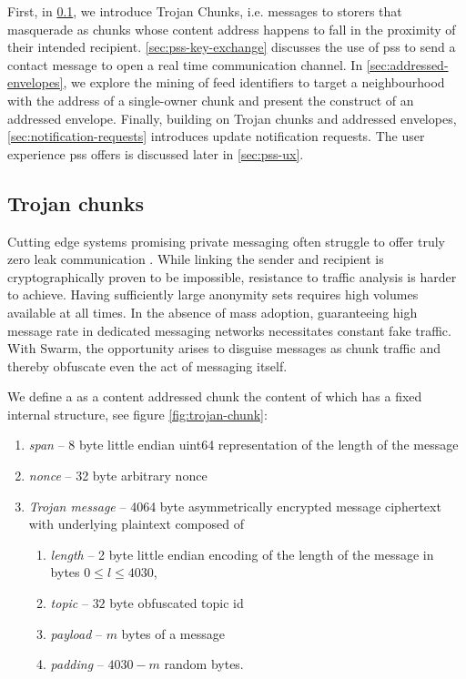 First, in \ref{sec:trojan}, we introduce Trojan Chunks, i.e. messages to storers that masquerade as chunks whose content address happens to fall in the proximity of their intended recipient. 
\ref{sec:pss-key-exchange} discusses the use of pss to send a contact message to open a real time communication channel.
In \ref{sec:addressed-envelopes}, we explore the mining of feed identifiers to target a neighbourhood with the address of a single-owner chunk and present the construct of an addressed envelope. Finally, building on Trojan chunks and addressed envelopes, \ref{sec:notification-requests} introduces update notification requests.
The user experience pss offers is discussed later in \ref{sec:pss-ux}. 

\subsection{Trojan chunks\statusgreen}\label{sec:trojan}

Cutting edge systems promising private messaging often struggle to offer truly zero leak communication \cite{kwon2016riffle}. While linking the sender and recipient is cryptographically proven to be impossible, resistance to traffic analysis is harder to achieve. Having sufficiently large anonymity sets requires high volumes available at all times. In the absence of mass adoption, guaranteeing high message rate in dedicated messaging networks necessitates constant fake traffic. With Swarm, the opportunity arises to disguise messages as chunk traffic and thereby obfuscate even the act of messaging itself. 

We define a  as a content addressed chunk the content of which has a fixed internal structure, see figure \ref{fig:trojan-chunk}:

\begin{enumerate}
    \item \emph{span} -- 8 byte little endian uint64 representation of the length of the message  
    \item \emph{nonce} -- 32 byte arbitrary nonce 
    \item \emph{Trojan message} -- 4064 byte asymmetrically encrypted message ciphertext with underlying plaintext composed of
    \begin{enumerate}
        \item \emph{length} -- 2 byte little endian encoding of the length of the message in bytes $0\leq l\leq 4030$,
        \item \emph{topic} -- $32$ byte obfuscated topic id   
        \item \emph{payload} -- $m$ bytes of a message 
        \item \emph{padding} -- $4030-m$ random bytes.
    \end{enumerate}
\end{enumerate}

